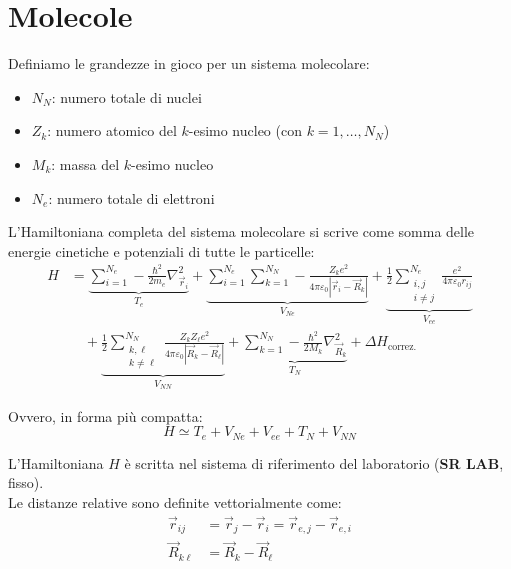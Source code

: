 \chapter{Molecole}

Definiamo le grandezze in gioco per un sistema molecolare:
\begin{itemize}
    \item \( N_N \): numero totale di nuclei
    \item \( Z_k \): numero atomico del \( k \)-esimo nucleo (con \( k=1, \dots, N_N \))
    \item \( M_k \): massa del \( k \)-esimo nucleo
    \item \( N_e \): numero totale di elettroni
\end{itemize}

L'Hamiltoniana completa del sistema molecolare si scrive come somma delle energie cinetiche e potenziali di tutte le particelle:
\begin{align}
    H &= \underbrace{\sum_{i=1}^{N_e} -\frac{\hbar^2}{2m_e} \nabla_{\vec{r}_i}^2}_{T_e} 
    + \underbrace{\sum_{i=1}^{N_e} \sum_{k=1}^{N_N} -\frac{Z_k e^2}{4\pi\varepsilon_0 |\vec{r}_i - \vec{R}_k|}}_{V_{Ne}} 
    + \underbrace{\frac{1}{2} \sum_{\substack{i,j \\ i \neq j}}^{N_e} \frac{e^2}{4\pi\varepsilon_0 r_{ij}}}_{V_{ee}} \nonumber \\[1.5ex]
    &\quad + \underbrace{\frac{1}{2} \sum_{\substack{k,\ell \\ k \neq \ell}}^{N_N} \frac{Z_k Z_\ell e^2}{4\pi\varepsilon_0 |\vec{R}_k - \vec{R}_\ell|}}_{V_{NN}} 
    + \underbrace{\sum_{k=1}^{N_N} -\frac{\hbar^2}{2M_k} \nabla_{\vec{R}_k}^2}_{T_N} 
    + \Delta H_{\text{correz.}}
\end{align}

Ovvero, in forma più compatta:
\begin{equation}
    H \simeq T_e + V_{Ne} + V_{ee} + T_N + V_{NN}
\end{equation}

\begin{attention}
    L'Hamiltoniana \( H \) è scritta nel sistema di riferimento del laboratorio (\textbf{SR LAB}, fisso). \\
    Le distanze relative sono definite vettorialmente come:
    \begin{align}
        \vec{r}_{ij} &= \vec{r}_j - \vec{r}_i = \vec{r}_{e,j} - \vec{r}_{e,i} \\
        \vec{R}_{k\ell} &= \vec{R}_k - \vec{R}_\ell
    \end{align}
\end{attention}

